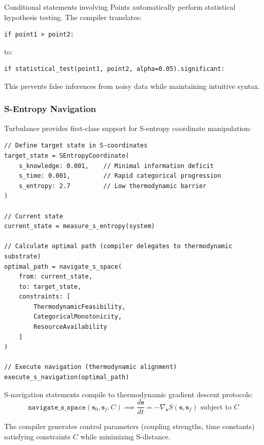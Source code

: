 \begin{proposition}
Conditional statements involving Points automatically perform statistical hypothesis testing. The compiler translates:
\begin{verbatim}
if point1 > point2:
\end{verbatim}

to:
\begin{verbatim}
if statistical_test(point1, point2, alpha=0.05).significant:
\end{verbatim}

This prevents false inferences from noisy data while maintaining intuitive syntax.
\end{proposition}

\subsubsection{S-Entropy Navigation}

Turbulance provides first-class support for S-entropy coordinate manipulation:

\begin{verbatim}
// Define target state in S-coordinates
target_state = SEntropyCoordinate(
    s_knowledge: 0.001,    // Minimal information deficit
    s_time: 0.001,         // Rapid categorical progression
    s_entropy: 2.7         // Low thermodynamic barrier
)

// Current state
current_state = measure_s_entropy(system)

// Calculate optimal path (compiler delegates to thermodynamic substrate)
optimal_path = navigate_s_space(
    from: current_state,
    to: target_state,
    constraints: [
        ThermodynamicFeasibility,
        CategoricalMonotonicity,
        ResourceAvailability
    ]
)

// Execute navigation (thermodynamic alignment)
execute_s_navigation(optimal_path)
\end{verbatim}

\begin{theorem}
\label{thm:s_navigation_compilation}
S-navigation statements compile to thermodynamic gradient descent protocols:
\begin{equation}
\texttt{navigate\_s\_space}(\mathbf{s}_0, \mathbf{s}_f, C) \implies \frac{d\mathbf{s}}{dt} = -\nabla_{\mathbf{s}} S(\mathbf{s}, \mathbf{s}_f) \text{ subject to } C
\end{equation}

The compiler generates control parameters (coupling strengths, time constants) satisfying constraints $C$ while minimizing S-distance.
\end{theorem}

